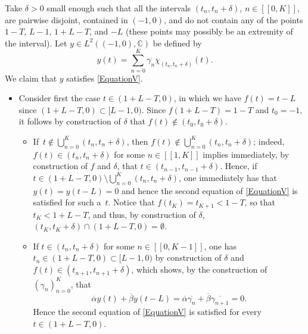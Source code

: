 \documentclass[10pt]{article}
\newcommand{\llbracket}{[\![}
\newcommand{\rrbracket}{]\!]}
\theoremstyle{plain}
\theoremstyle{definition}
\numberwithin{equation}{section}\numberwithin{figure}{section}\emergencystretch=3em
\begin{document}
Take $\delta > 0$ small enough such that all the intervals $(t_n, t_n + \delta)$, $n \in \llbracket 0, K\rrbracket$, are pairwise disjoint, contained in $(-1, 0)$, and do not contain any of the points $1 - T$, $L - 1$, $1 + L - T$, and $-L$ (these points may possibly be an extremity of the interval). Let $y \in L^2((-1, 0), \mathbb C)$ be defined by
\begin{equation}
\label{DefV}
y(t) = \sum_{n=0}^K \overline{\gamma_n} \chi_{(t_n, t_n + \delta)}(t).
\end{equation}
We claim that $y$ satisfies \eqref{EquationV}.
\begin{itemize}
\item
Consider first the case $t \in (1 + L - T, 0)$, in which we have $f(t) = t - L$ since $(1 + L - T, 0) \subset [L - 1, 0)$. Since $f(1 + L - T) = 1 - T$ and $t_0 = -1$, it follows by construction of $\delta$ that $f(t) \notin (t_0, t_0 + \delta)$.
\begin{itemize}
\item
If~\hbox{$t \!\notin\! \bigcup_{n=0}^K (t_n, t_n + \delta)$}, then $f(t) \!\notin\! \bigcup_{n=0}^K (t_n, t_n + \delta)$; indeed, $f(t) \!\in\! (t_n, t_n + \delta)$ for some $n \in \llbracket 1, K\rrbracket$ implies immediately, by construction of $f$ and $\delta$, that \hbox{$t \in (t_{n-1}, t_{n-1} + \delta)$}. Hence, if \hbox{$t \in (1 + L - T, 0) \setminus \bigcup_{n=0}^K (t_n, t_n + \delta)$}, one immediately has that \hbox{$y(t) = y(t - L) = 0$} and hence the second equation of \eqref{EquationV} is satisfied for such a~$t$. Notice that $f(t_K) = t_{K+1} < 1 - T$, so that $t_K < 1 + L - T$, and thus, by construction of $\delta$, \hbox{$(t_K, t_K + \delta) \cap (1 + L - T, 0) = \emptyset$}.
\item
If $t \in (t_n, t_n + \delta)$ for some $n \in \llbracket 0, K - 1\rrbracket$, one has $t_n \in (1 + L - T, 0) \subset [L - 1, 0)$ by construction of $\delta$ and $f(t) \in (t_{n+1}, t_{n+1} + \delta)$, which shows, by the construction of $(\gamma_n)_{n=0}^K$, that
\[
\overline\alpha y(t) + \overline\beta y(t - L) = \overline\alpha \overline{\gamma_n} + \overline\beta \overline{\gamma_{n+1}} = 0.
\]
Hence the second equation of \eqref{EquationV} is satisfied for every $t \in (1 + L - T, 0)$.
\end{itemize}


\end{itemize}
\end{document}
